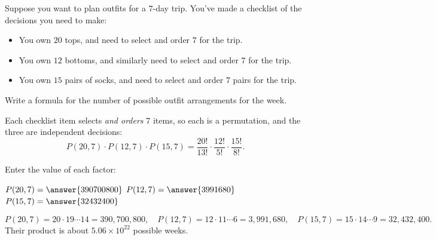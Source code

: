 \documentclass[12pt]{ximera}
\begin{document}
\begin{problem}
Suppose you want to plan outfits for a $7$-day trip. You've made a checklist of the
decisions you need to make:
\begin{itemize}
\item You own $20$ tops, and need to select and order $7$ for the trip.
\item You own $12$ bottoms, and similarly need to select and order $7$ for the trip.
\item You own $15$ pairs of socks, and need to select and order $7$ pairs for the trip.
\end{itemize}

\begin{prompt}
Write a formula for the number of possible outfit arrangements for the week.

\begin{freeResponse}
\end{freeResponse}

\begin{feedback}
Each checklist item selects \emph{and orders} $7$ items, so each is a permutation, and
the three are independent decisions:
\[
P(20,7)\cdot P(12,7)\cdot P(15,7) = \frac{20!}{13!}\cdot\frac{12!}{5!}\cdot\frac{15!}{8!}.
\]
\end{feedback}
\end{prompt}

\begin{prompt}
Enter the value of each factor:

$P(20,7)=\answer{390700800}$ \qquad $P(12,7)=\answer{3991680}$ \qquad
$P(15,7)=\answer{32432400}$

\begin{feedback}
\[
P(20,7)=20\cdot 19\cdots 14=390{,}700{,}800,\quad
P(12,7)=12\cdot 11\cdots 6=3{,}991{,}680,\quad
P(15,7)=15\cdot 14\cdots 9=32{,}432{,}400.
\]
Their product is about $5.06\times 10^{22}$ possible weeks.
\end{feedback}
\end{prompt}
\end{problem}
\end{document}
